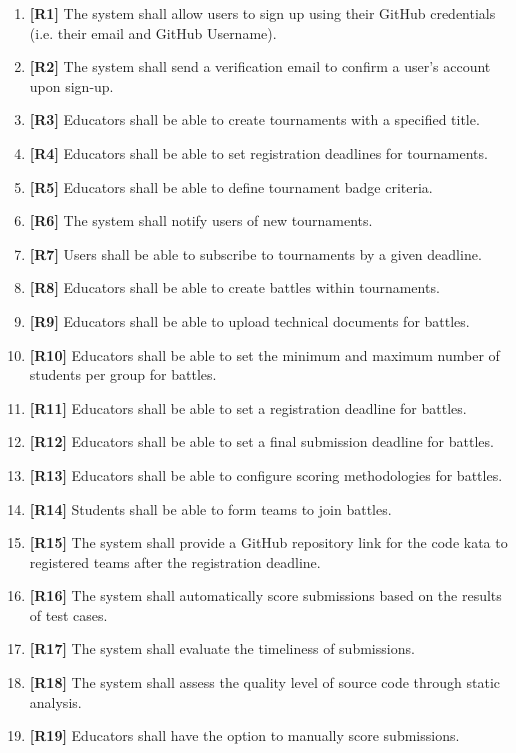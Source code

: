 \begin{enumerate}
    \item \textbf{[R1]} The system shall allow users to sign up using their GitHub credentials (i.e. their email and GitHub Username).
    \item \textbf{[R2]} The system shall send a verification email to confirm a user's account upon sign-up.
    \item \textbf{[R3]} Educators shall be able to create tournaments with a specified title.
    \item \textbf{[R4]} Educators shall be able to set registration deadlines for tournaments.
    \item \textbf{[R5]} Educators shall be able to define tournament badge criteria.
    \item \textbf{[R6]} The system shall notify users of new tournaments.
    \item \textbf{[R7]} Users shall be able to subscribe to tournaments by a given deadline.
    \item \textbf{[R8]} Educators shall be able to create battles within tournaments.
    \item \textbf{[R9]} Educators shall be able to upload technical documents for battles.
    \item \textbf{[R10]} Educators shall be able to set the minimum and maximum number of students per group for battles.
    \item \textbf{[R11]} Educators shall be able to set a registration deadline for battles.
    \item \textbf{[R12]} Educators shall be able to set a final submission deadline for battles.
    \item \textbf{[R13]} Educators shall be able to configure scoring methodologies for battles.
    \item \textbf{[R14]} Students shall be able to form teams to join battles.
    \item \textbf{[R15]} The system shall provide a GitHub repository link for the code kata to registered teams after the registration deadline.
    \item \textbf{[R16]} The system shall automatically score submissions based on the results of test cases.
    \item \textbf{[R17]} The system shall evaluate the timeliness of submissions.
    \item \textbf{[R18]} The system shall assess the quality level of source code through static analysis.
    \item \textbf{[R19]} Educators shall have the option to manually score submissions.

\end{enumerate}
